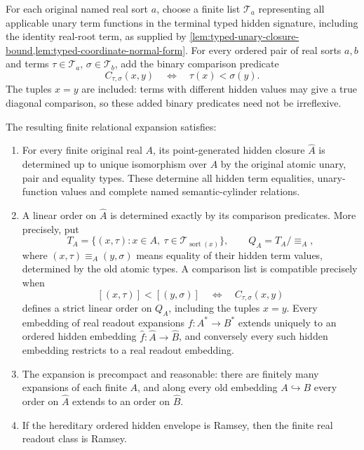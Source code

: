 \begin{lemma}
\label{lem:typed-finite-ordered-real-readout}
For each original named real sort $a$, choose a finite list
$\mathcal T_a$ representing all applicable unary term functions
in the terminal typed hidden signature, including the identity
real-root term, as supplied by
\cref{lem:typed-unary-closure-bound,lem:typed-coordinate-normal-form}.
For every ordered pair of real sorts $a,b$ and terms
$\tau\in\mathcal T_a$, $\sigma\in\mathcal T_b$, add the binary
comparison predicate
\[
 C_{\tau,\sigma}(x,y)
       \quad\Longleftrightarrow\quad \tau(x)<\sigma(y).
\tag{TOR}\label{eq:typed-ordered-real-readout}
\]
The tuples $x=y$ are included: terms with different hidden
values may give a true diagonal comparison, so these added
binary predicates need not be irreflexive.

The resulting finite relational expansion satisfies:
\begin{enumerate}[label=(\roman*)]
\item For every finite original real $A$, its point-generated
hidden closure $\widehat A$ is determined up to unique
isomorphism over $A$ by the original atomic unary, pair and
equality types. These determine all hidden term equalities,
unary-function values and complete named semantic-cylinder
relations.
\item A linear order on $\widehat A$ is determined exactly by
its comparison predicates. More precisely, put
\[
 T_A=\{(x,\tau):x\in A,\ \tau\in\mathcal T_{\operatorname{sort}(x)}\},
 \qquad Q_A=T_A/{\equiv_A},
\]
where $(x,\tau)\equiv_A(y,\sigma)$ means equality of their
hidden term values, determined by the old atomic types.
A comparison list is compatible precisely when
\[
 [(x,\tau)]<[(y,\sigma)]
       \quad\Longleftrightarrow\quad C_{\tau,\sigma}(x,y)
\]
defines a strict linear order on $Q_A$, including the tuples
$x=y$. Every embedding of real readout expansions
$f:A^*\to B^*$ extends uniquely to an ordered hidden embedding
$\widehat f:\widehat A\to\widehat B$, and conversely every
such hidden embedding restricts to a real readout embedding.
\item The expansion is precompact and reasonable: there are
finitely many expansions of each finite $A$, and along every
old embedding $A\hookrightarrow B$ every order on $\widehat A$
extends to an order on $\widehat B$.
\item If the hereditary ordered hidden envelope is Ramsey,
then the finite real readout class is Ramsey.
\end{enumerate}
\end{lemma}
